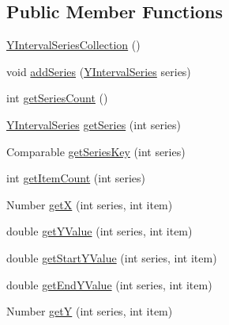\subsection*{Public Member Functions}
\begin{DoxyCompactItemize}
\item 
\mbox{\hyperlink{classorg_1_1jfree_1_1data_1_1xy_1_1_y_interval_series_collection_a0d20ca29b22d09f402eca45b353441e0}{Y\+Interval\+Series\+Collection}} ()
\item 
void \mbox{\hyperlink{classorg_1_1jfree_1_1data_1_1xy_1_1_y_interval_series_collection_a55aa873b45ae787c1f97a7cad7ea4871}{add\+Series}} (\mbox{\hyperlink{classorg_1_1jfree_1_1data_1_1xy_1_1_y_interval_series}{Y\+Interval\+Series}} series)
\item 
int \mbox{\hyperlink{classorg_1_1jfree_1_1data_1_1xy_1_1_y_interval_series_collection_ac7e43d8de0b3233231f55f21f865e242}{get\+Series\+Count}} ()
\item 
\mbox{\hyperlink{classorg_1_1jfree_1_1data_1_1xy_1_1_y_interval_series}{Y\+Interval\+Series}} \mbox{\hyperlink{classorg_1_1jfree_1_1data_1_1xy_1_1_y_interval_series_collection_a4962eaf5aaf01293c6edb45121eddc4d}{get\+Series}} (int series)
\item 
Comparable \mbox{\hyperlink{classorg_1_1jfree_1_1data_1_1xy_1_1_y_interval_series_collection_a7901701d59661b8b7a758a504668f258}{get\+Series\+Key}} (int series)
\item 
int \mbox{\hyperlink{classorg_1_1jfree_1_1data_1_1xy_1_1_y_interval_series_collection_a9a30e504b86b6ac333de0c3e34a3907d}{get\+Item\+Count}} (int series)
\item 
Number \mbox{\hyperlink{classorg_1_1jfree_1_1data_1_1xy_1_1_y_interval_series_collection_aea821e6f7de4ea55e3ebf533ae124c10}{getX}} (int series, int item)
\item 
double \mbox{\hyperlink{classorg_1_1jfree_1_1data_1_1xy_1_1_y_interval_series_collection_a741571e5d370b9f083cea6419b417954}{get\+Y\+Value}} (int series, int item)
\item 
double \mbox{\hyperlink{classorg_1_1jfree_1_1data_1_1xy_1_1_y_interval_series_collection_a3f029817a3f87b12926083b76d0ce5e0}{get\+Start\+Y\+Value}} (int series, int item)
\item 
double \mbox{\hyperlink{classorg_1_1jfree_1_1data_1_1xy_1_1_y_interval_series_collection_a1a7adfd154a7e2ddf872f4edfeb09dc7}{get\+End\+Y\+Value}} (int series, int item)
\item 
Number \mbox{\hyperlink{classorg_1_1jfree_1_1data_1_1xy_1_1_y_interval_series_collection_a68019ee85c039bec59b0a3a61989d131}{getY}} (int series, int item)

\end{DoxyCompactItemize}
